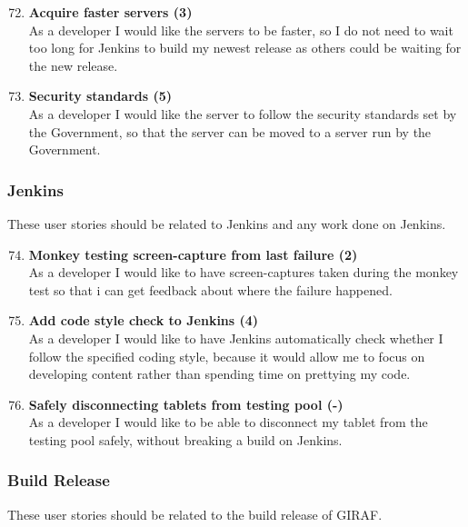 \begin{enumerate}
	\setcounter{enumi}{71} %
	\item \textbf{Acquire faster servers (3)} \\
	As a developer I would like the servers to be faster, so I do not need to wait too long for Jenkins to build my newest release as others could be waiting for the new release.
	
	\item \textbf{Security standards (5)} \\
	As a developer I would like the server to follow the security standards set by the Government, so that the server can be moved to a server run by the Government.
\end{enumerate}

\subsubsection{Jenkins}
These user stories should be related to Jenkins and any work done on Jenkins.

\begin{enumerate}
	\setcounter{enumi}{73} %
	\item \textbf{Monkey testing screen-capture from last failure (2)}\\
	As a developer I would like to have screen-captures taken during the monkey test so that i can get feedback about where the failure happened. 
	
	\item \textbf{Add code style check to Jenkins (4)}\\
	As a developer I would like to have Jenkins automatically check whether I follow the specified coding style, because it would allow me to focus on developing content rather than spending time on prettying my code.
	
	\item \textbf{Safely disconnecting tablets from testing pool (-)}\\
	As a developer I would like to be able to disconnect my tablet from the testing pool safely, without breaking a build on Jenkins.
\end{enumerate}

\subsubsection{Build Release}
These user stories should be related to the build release of GIRAF.


